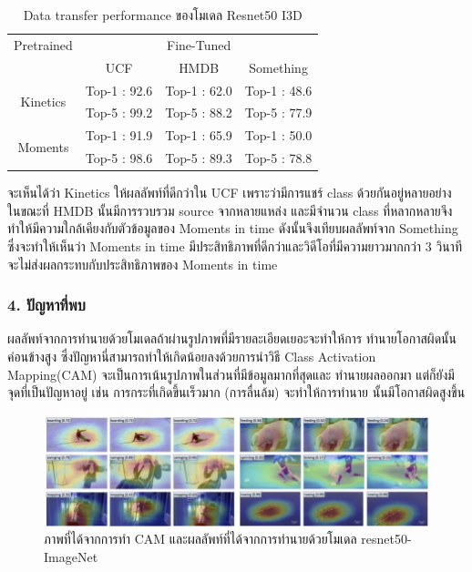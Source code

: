 \begin{table}[!ht]
	\centering
	\begin{tabular}{|c|c|c|c|}
		\hline
		{Pretrained}&\multicolumn{3}{c|}{Fine-Tuned}\\
		\cline{2-4}
		{}			& UCF		& HMDB		& Something			\\
		\hline
		\multirow{2}{*}{Kinetics}		& Top-1 : 92.6		& Top-1 : 62.0		& Top-1 : 48.6		\\
		{}						& Top-5 : 99.2		& Top-5 : 88.2		& Top-5 : 77.9		\\
		\hline
		\multirow{2}{*}{Moments}		& Top-1 : 91.9		& Top-1 : 65.9		& Top-1 : 50.0		\\
		{}						& Top-5 : 98.6		& Top-5 : 89.3		& Top-5 : 78.8		\\
		\hline
	\end{tabular}
	\caption{Data transfer performance ของโมเดล Resnet50 I3D}
	\label{tab: Data transfer performance ของโมเดล Resnet50 I3D}
\end{table}

จะเห็นได้ว่า Kinetics ให้ผลลัพท์ที่ดีกว่าใน UCF เพราะว่ามีการแชร์ class ด้วยกันอยู่หลายอย่าง ในขณะที่ HMDB นั้นมีการรวบรวม source จากหลายแหล่ง และมีจำนวน class ที่หลากหลายจึงทำให้มีความใกล้เคียงกับตัวข้อมูลของ Moments in time ดังนั้นจึงเทียบผลลัพท์จาก Something ซึ่งจะทำให้เห็นว่า Moments in time มีประสิทธิภาพที่ดีกว่าและวิดีโอที่มีความยาวมากกว่า 3 วินาทีจะไม่ส่งผลกระทบกับประสิทธิภาพของ Moments in time

\subsubsection*{4. ปัญหาที่พบ}
ผลลัพท์จากการทำนายด้วยโมเดลถ้าผ่านรูปภาพที่มีรายละเอียดเยอะจะทำให้การ ทำนายโอกาสผิดนั้นค่อนข้างสูง ซึ่งปัญหานี่สามารถทำให้เกิดน้อยลงด้วยการนำวิธี Class Activation Mapping(CAM) จะเป็นการเน้นรูปภาพในส่วนที่มีข้อมูลมากที่สุดและ ทำนายผลออกมา แต่ก็ยังมีจุดที่เป็นปัญหาอยู่ เช่น การกระที่เกิดขึ้นเร็วมาก (การลื่นล้ม) จะทำให้การทำนาย นั้นมีโอกาสผิดสูงขึ้น 

\begin{figure}[!ht]
	\centering
	\includegraphics[width=1\textwidth]{chapter2/images/CAM.png}
		\caption{ภาพที่ได้จากการทำ CAM และผลลัพท์ที่ได้จากการทำนายด้วยโมเดล resnet50-ImageNet}
    	\label{fig:CAM}
\end{figure}


